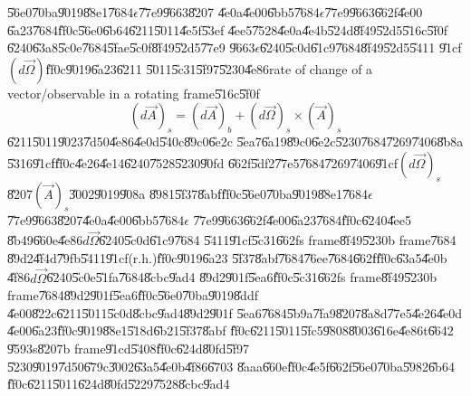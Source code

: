 \documentclass[12pt,a4paper]{article}
\begin{document}
\U{56e0}\U{70ba}\U{9019}\U{88e1}\U{7684}$\epsilon $\U{77e9}\U{9663}\U{8207}%
\U{4e0a}\U{4e00}\U{6bb5}\U{7684}$\epsilon $\U{77e9}\U{9663}\U{662f}\U{4e00}%
\U{6a23}\U{7684}\U{ff0c}\U{56e0}\U{6b64}\U{6211}\U{5011}\U{4e5f}\U{53ef}%
\U{4ee5}\U{7528}\U{4e0a}\U{4e4b}\U{524d}\U{8f49}\U{52d5}\U{516c}\U{5f0f}%
\U{6240}\U{63a8}\U{5c0e}\U{7684}\U{5fae}\U{5c0f}\U{8f49}\U{52d5}\U{77e9}%
\U{9663}$\epsilon $\U{6240}\U{5c0d}\U{61c9}\U{7684}\U{8f49}\U{52d5}\U{5411}%
\U{91cf}$\left( d\vec{\Omega}\right) $\U{ff0c}\U{9019}\U{6a23}\U{6211}%
\U{5011}\U{5c31}\U{5f97}\U{5230}\U{4e86}rate of change of a
vector/observable in a rotating frame\U{516c}\U{5f0f}%
\begin{equation}
\left( d\vec{A}\right) _{s}=\left( d\vec{A}\right) _{b}+\left( d\vec{\Omega}%
\right) _{s}\times \left( \vec{A}\right) _{s}  \label{rateofdomega}
\end{equation}%
\U{6211}\U{5011}\U{9023}\U{7d50}\U{4e86}\U{4e0d}\U{540c}\U{89c0}\U{6e2c}%
\U{5ea7}\U{6a19}\U{89c0}\U{6e2c}\U{5230}\U{7684}\U{7269}\U{7406}\U{8b8a}%
\U{5316}\U{91cf}\U{ff0c}\U{4e26}\U{4e14}\U{6240}\U{7528}\U{5230}\U{90fd}%
\U{662f}\U{5df2}\U{77e5}\U{7684}\U{7269}\U{7406}\U{91cf}$\left( d\vec{\Omega}%
\right) _{s}$\U{8207}$\left( \vec{A}\right) _{s}$\U{3002}\U{9019}\U{908a}%
\U{8981}\U{5f37}\U{8abf}\U{ff0c}\U{56e0}\U{70ba}\U{9019}\U{88e1}\U{7684}$%
\epsilon $\U{77e9}\U{9663}\U{8207}\U{4e0a}\U{4e00}\U{6bb5}\U{7684}$\epsilon $%
\U{77e9}\U{9663}\U{662f}\U{4e00}\U{6a23}\U{7684}\U{ff0c}\U{6240}\U{4ee5}%
\U{8b49}\U{660e}\U{4e86}$d\vec{\Omega}$\U{6240}\U{5c0d}\U{61c9}\U{7684}%
\U{5411}\U{91cf}\U{5c31}\U{662f}s frame\U{8f49}\U{5230}b frame\U{7684}%
\U{89d2}\U{4f4d}\U{79fb}\U{5411}\U{91cf}(r.h.)\U{ff0c}\U{9019}\U{6a23}%
\U{5f37}\U{8abf}\U{7684}\U{76ee}\U{7684}\U{662f}\U{ff0c}\U{63a5}\U{4e0b}%
\U{4f86}$d\vec{\Omega}$\U{6240}\U{5c0e}\U{51fa}\U{7684}\U{8cbc}\U{9ad4}%
\U{89d2}\U{901f}\U{5ea6}\U{ff0c}\U{5c31}\U{662f}s frame\U{8f49}\U{5230}b
frame\U{7684}\U{89d2}\U{901f}\U{5ea6}\U{ff0c}\U{56e0}\U{70ba}\U{9019}\U{8ddf}%
\U{4e00}\U{822c}\U{6211}\U{5011}\U{5c0d}\U{8cbc}\U{9ad4}\U{89d2}\U{901f}%
\U{5ea6}\U{7684}\U{5b9a}\U{7fa9}\U{8207}\U{8a8d}\U{77e5}\U{4e26}\U{4e0d}%
\U{4e00}\U{6a23}\U{ff0c}\U{9019}\U{88e1}\U{518d}\U{6b21}\U{5f37}\U{8abf}%
\U{ff0c}\U{6211}\U{5011}\U{5fc5}\U{9808}\U{8003}\U{616e}\U{4e86}t\U{6642}%
\U{9593}s\U{8207}b frame\U{91cd}\U{5408}\U{ff0c}\U{624d}\U{80fd}\U{5f97}%
\U{5230}\U{9019}\U{7d50}\U{679c}\U{3002}\U{63a5}\U{4e0b}\U{4f86}\U{6703}%
\U{8aaa}\U{660e}\U{ff0c}\U{4e5f}\U{662f}\U{56e0}\U{70ba}\U{5982}\U{6b64}%
\U{ff0c}\U{6211}\U{5011}\U{624d}\U{80fd}\U{5229}\U{7528}\U{8cbc}\U{9ad4}%
\end{document}
